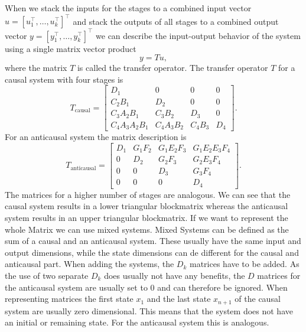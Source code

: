 \documentclass[doctype=mastersthesis,BCOR=15mm,biblatex]{ldvbook}%
\begin{document}
When we stack the inputs for the stages to a combined input vector $u = [u_1^\top, \dots ,u_k^\top]^\top$ and stack the outputs of all stages to a combined output vector $y = [y_1^\top, \dots ,y_k^\top]^\top$ we can describe the input-output behavior of the system using a single matrix vector product 
\begin{equation}\label{eq:System_mat_vec}
	y = Tu,
\end{equation}
where the matrix $T$ is called the transfer operator.
The transfer operator $T$ for a causal system with four stages is
\begin{equation}\label{eq:T_causal}
T_\text{causal}=
\begin{bmatrix}D_{1} & 0 & 0 & 0\\C_{2} B_{1} & D_{2} & 0 & 0\\
C_{3} A_{2} B_{1} & C_{3} B_{2} & D_{3} & 0\\
C_{4} A_{3} A_{2} B_{1} & C_{4} A_{3} B_{2} & C_{4} B_{3} & D_{4}\end{bmatrix}
.
\end{equation}
For an anticausal system the matrix description is 
\begin{equation}
T_{\text{anticausal}}=
\begin{bmatrix}D_{1} & G_{1} F_{2} & G_{1} E_{2} F_{3} & G_{1} E_{2} E_{3} F_{4}\\
0 & D_{2} & G_{2} F_{3} & G_{2} E_{3} F_{4}\\
0 & 0 & D_{3} & G_{3} F_{4}\\
0 & 0 & 0 & D_{4}\end{bmatrix}.
\end{equation}
The matrices for a higher number of stages are analogous.
We can see that the causal system results in a lower triangular blockmatrix whereas the anticausal system results in an upper triangular blockmatrix.
If we want to represent the whole Matrix we can use mixed systems.
Mixed Systems can be defined as the sum of a causal and an anticausal system.
These usually have the same input and output dimensions, while the state dimensions can de different for the causal and anticausal part.
When adding the systems,  the $D_k$ matrices have to be added.
As the use of two separate $D_k$ does usually not have any benefits, the $D$ matrices for the anticausal system are usually set to 0 and can therefore be ignored.
When representing matrices the first state $x_1$ and the last state $x_{n+1}$ of the causal system are usually zero dimensional.
This means that the system does not have an initial or remaining state.
For the anticausal system this is analogous.
\end{document}
